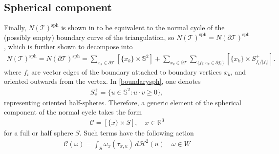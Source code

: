 \documentclass[sn-mathphys-num]{sn-jnl}%
\theoremstyle{thmstyleone}%
\theoremstyle{thmstyletwo}%
\theoremstyle{thmstylethree}%
\numberwithin{remark}{section}
\numberwithin{definition}{section}
\numberwithin{equation}{section}
\numberwithin{theorem}{section}
\newcommand{\R}{\ensuremath{\mathbb{R}}}%
\begin{document}
\subsection{Spherical component}
Finally, $N(\mathcal{T})^{\mathrm{sph}}$ is shown in \cite{NCpaper} to be equivalent to the normal cycle of the (possibly empty) boundary curve of the triangulation, so $N(\mathcal{T})^{\mathrm{sph}} = N(\partial \mathcal{T})^{\mathrm{sph}}$,
which is further shown to decompose into   
\begin{align}\label{boundarysph}
   N(\mathcal{T})^{\mathrm{sph}} =  N(\partial \mathcal{T})^{\mathrm{sph}} =  \sum_{x_{k} \in \partial \mathcal{T}}{ [\{x_{k}\}\times \mathbb{S}^{2}] } +  \sum_{x_{k} \in \partial \mathcal{T}}\sum_{\{ f_{i}\colon e_k\in \partial f_i\} }{ [\{x_{k}\}\times S_{f_{i}/\lvert f_{i} \rvert}^{+}] }.
\end{align}
where $f_{i}$ are vector edges of the boundary attached to boundary vertices $x_{k}$, and oriented outwards from the vertex. In \cref{boundarysph}, one denotes
\begin{align*}
S_{v}^{+} = \{u \in \mathbb{S}^{2}: u\cdot v \geq 0  \},
\end{align*}
representing oriented half-spheres. Therefore, a generic element of the spherical component of the normal cycle takes the form
\begin{align*}
    \mathcal{C} = [\{x\} \times S],\quad x \in \R^{3}
\end{align*}
for a full or half sphere $S$. Such terms have the following action
\begin{align*}
     \mathcal{C}(\omega) = \int_{S}{\omega_{x}(\tau_{x,u})\,d\mathcal{H}^{2}(u) }\quad \omega \in W 
\end{align*}%
\end{document}
